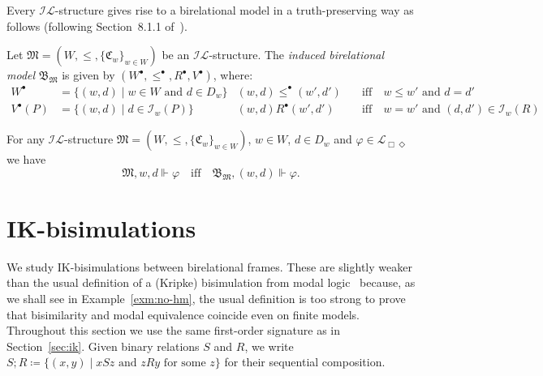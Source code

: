 \documentclass[submission,copyright,creativecommons]{eptcs}
\newcommand{\mo}{\mathfrak}
\newcommand{\B}{\mo{B}}
\renewcommand{\phi}{\varphi}
\renewcommand{\iff}{\quad\text{iff}\quad}
\newcommand{\II}{\mathscr{I}}
\newcommand{\IL}{\mathscr{I\!\!L}}   %
\newcommand{\ML}{\mathcal{L}_{\Box\Diamond}}        %
\newcommand{\msatisfy}[3]{#1, #2 \Vdash #3}
\begin{document}
  Every $\IL$-structure gives rise to a birelational model in a truth-preserving way as follows (following Section~8.1.1 of~\cite{Sim94}).

\begin{definition}
  Let $\mo{M} = (W, \leq, \{ \mo{C}_w \}_{w \in W})$ be an $\IL$-structure.
  The \emph{induced birelational model} $\B_{\mo{M}}$ is given by 
  $(W^{\bullet}, \leq^{\bullet}, R^{\bullet}, V^{\bullet})$,
  where:
  \begin{align*}
    W^{\bullet}
      &= \{ (w, d) \mid w \in W \text{ and } d \in D_w \} 
      &(w, d) \leq^{\bullet} (w', d')
      &\iff w \leq w' \text{ and } d = d' \\
    V^{\bullet}(P)
      &= \{ (w, d) \mid d \in \II_w(P)\}
      &(w, d) R^{\bullet} (w', d')
      &\iff w = w' \text{ and } (d, d') \in \II_w(R)
  \end{align*}
\end{definition}

\begin{lemma}\label{lem:induced-birel}
  For any $\IL$-structure $\mo{M} = (W, \leq, \{ \mo{C}_w \}_{w \in W})$,
  $w \in W$, $d \in D_w$ and $\phi \in \ML$ we have
  \begin{equation*}\msatisfy{\mo{M}}{w, d}\phi \iff \msatisfy{\B_{\mo{M}}}{(w,d)}{\phi}.\end{equation*}
\end{lemma}



\section{IK-bi\-si\-mu\-la\-tions}
\label{sec:biss}

  We study IK-bi\-si\-mu\-la\-tions between birelational frames.
  These are slightly weaker than the usual definition of a (Kripke) bisimulation from
  modal logic~\cite[Section~2.2]{BlaRijVen01} because, as we shall see in
  Example~\ref{exm:no-hm}, the usual definition is too strong to prove that
  bisimilarity and modal equivalence coincide even on finite models.
  Throughout this section we use the same first-order signature as in
  Section~\ref{sec:ik}.
  Given binary relations $S$ and $R$, we write
  $S \mathrel{;} R \coloneq \{ (x, y) \mid xSz \text{ and } zRy \text{ for some } z \}$ for their sequential composition.
\end{document}
